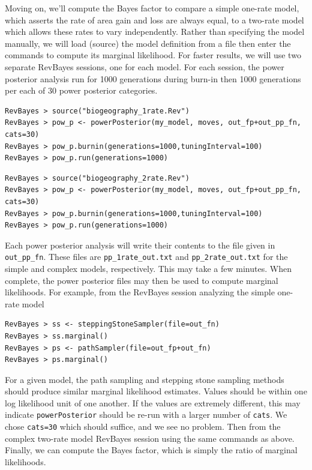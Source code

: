 \documentclass[11pt]{article}
\begin{document}
Moving on, we'll compute the Bayes factor to compare a simple one-rate model, which asserts the rate of area gain and loss are always equal, to a two-rate model which allows these rates to vary independently.
Rather than specifying the model manually, we will load (source) the model definition from a file then enter the commands to compute its marginal likelihood.
For faster results, we will use two separate RevBayes sessions, one for each model.
For each session, the power posterior analysis run for 1000 generations during burn-in then 1000 generations per each of 30 power posterior categories.

\begin{snugshade}
\begin{lstlisting}
RevBayes > source("biogeography_1rate.Rev")
RevBayes > pow_p <- powerPosterior(my_model, moves, out_fp+out_pp_fn, cats=30) 
RevBayes > pow_p.burnin(generations=1000,tuningInterval=100)
RevBayes > pow_p.run(generations=1000)
\end{lstlisting}
\end{snugshade}

\begin{snugshade}
\begin{lstlisting}
RevBayes > source("biogeography_2rate.Rev")
RevBayes > pow_p <- powerPosterior(my_model, moves, out_fp+out_pp_fn, cats=30) 
RevBayes > pow_p.burnin(generations=1000,tuningInterval=100)
RevBayes > pow_p.run(generations=1000)  
\end{lstlisting}
\end{snugshade}

Each power posterior analysis will write their contents to the file given in {\tt out\_pp\_fn}.
These files are {\tt pp\_1rate\_out.txt} and {\tt pp\_2rate\_out.txt} for the simple and complex models, respectively.
This may take a few minutes.
When complete, the power posterior files may then be used to compute marginal likelihoods.
For example, from the RevBayes session analyzing the simple one-rate model

\begin{snugshade}
\begin{lstlisting}
RevBayes > ss <- steppingStoneSampler(file=out_fn)
RevBayes > ss.marginal() 
RevBayes > ps <- pathSampler(file=out_fp+out_fn)
RevBayes > ps.marginal() 
\end{lstlisting}
\end{snugshade}

For a given model, the path sampling and stepping stone sampling methods should produce similar marginal likelihood estimates.
Values should be within one log likelihood unit of one another.
If the values are extremely different, this may indicate {\tt powerPosterior} should be re-run with a larger number of {\tt cats}.
We chose {\tt cats=30} which should suffice, and we see no problem.
Then from the complex two-rate model RevBayes session using the same commands as above.
Finally, we can compute the Bayes factor, which is simply the ratio of marginal likelihoods.
\end{document}
